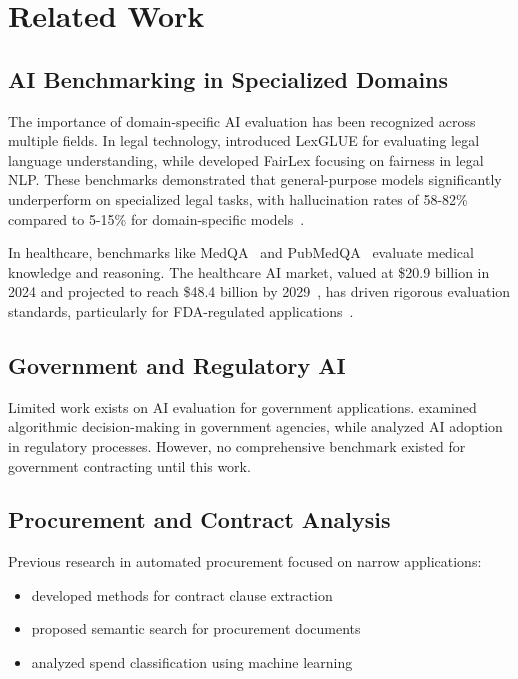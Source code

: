 \documentclass[11pt,a4paper]{article}
\begin{document}
\section{Related Work}

\subsection{AI Benchmarking in Specialized Domains}

The importance of domain-specific AI evaluation has been recognized across multiple fields. In legal technology, \citet{katz2024lexglue} introduced LexGLUE for evaluating legal language understanding, while \citet{chalkidis2022fairlex} developed FairLex focusing on fairness in legal NLP. These benchmarks demonstrated that general-purpose models significantly underperform on specialized legal tasks, with hallucination rates of 58-82\% compared to 5-15\% for domain-specific models~\citep{thomson2024legal}.

In healthcare, benchmarks like MedQA~\citep{jin2021disease} and PubMedQA~\citep{jin2019pubmedqa} evaluate medical knowledge and reasoning. The healthcare AI market, valued at \$20.9 billion in 2024 and projected to reach \$48.4 billion by 2029~\citep{marketsandmarkets2024}, has driven rigorous evaluation standards, particularly for FDA-regulated applications~\citep{fda2024ai}.

\subsection{Government and Regulatory AI}

Limited work exists on AI evaluation for government applications. \citet{engstrom2020government} examined algorithmic decision-making in government agencies, while \citet{coglianese2024administrative} analyzed AI adoption in regulatory processes. However, no comprehensive benchmark existed for government contracting until this work.

\subsection{Procurement and Contract Analysis}

Previous research in automated procurement focused on narrow applications:
\begin{itemize}
    \item \citet{wang2019automated} developed methods for contract clause extraction
    \item \citet{hendler2023semantic} proposed semantic search for procurement documents
    \item \citet{reis2024procurement} analyzed spend classification using machine learning
\end{itemize}
\end{document}
